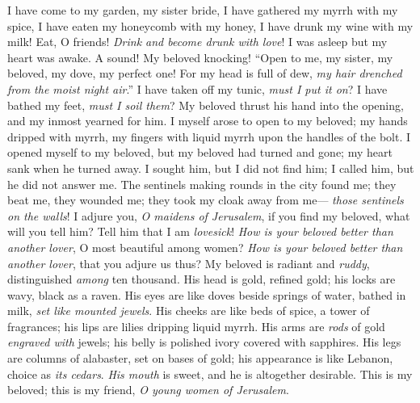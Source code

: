 \begin{biblechapter} %
\verse I have come to my garden, my sister bride, 
I have gathered my myrrh with my spice, 
I have eaten my honeycomb with my honey, 
I have drunk my wine with my milk! 
Eat, O friends! \textit{Drink and become drunk with love}!
 I was asleep but my heart was awake. 
A sound! My beloved knocking! 
“Open to me, my sister, my beloved, 
my dove, my perfect one! 
For my head is full of dew, 
\textit{my hair drenched from the moist night air}.”
\verse I have taken off my tunic, \textit{must I put it on}? 
I have bathed my feet, \textit{must I soil them}?
\verse My beloved thrust his hand into the opening, 
and my inmost yearned for him.
\verse I myself arose to open to my beloved; 
my hands dripped with myrrh, 
my fingers with liquid myrrh 
upon the handles of the bolt.
\verse I opened myself to my beloved, 
but my beloved had turned and gone; 
my heart sank when he turned away. 
I sought him, but I did not find him; 
I called him, but he did not answer me.
\verse The sentinels making rounds in the city found me; 
they beat me, they wounded me; 
they took my cloak away from me— 
\textit{those sentinels on the walls}!
 I adjure you, \textit{O maidens of Jerusalem}, 
if you find my beloved, what will you tell him? 
Tell him that I am \textit{lovesick}!
 \textit{How is your beloved better than another lover}, 
O most beautiful among women? 
\textit{How is your beloved better than another lover},  
that you adjure us thus?
\verse My beloved is radiant and \textit{ruddy}, 
distinguished \textit{among} ten thousand.
\verse His head is gold, refined gold; 
his locks are wavy, black as a raven.
\verse His eyes are like doves beside springs of water, 
bathed in milk, \textit{set like mounted jewels}.
\verse His cheeks are like beds of spice, a tower of fragrances; 
his lips are lilies dripping liquid myrrh.
\verse His arms are \textit{rods} of gold \textit{engraved with} jewels; 
his belly is polished ivory covered with sapphires.
\verse His legs are columns of alabaster, set on bases of gold; 
his appearance is like Lebanon, choice as \textit{its cedars}.
\verse \textit{His mouth} is sweet, 
and he is altogether desirable. 
This is my beloved; 
this is my friend, \textit{O young women of Jerusalem}.
\end{biblechapter}

